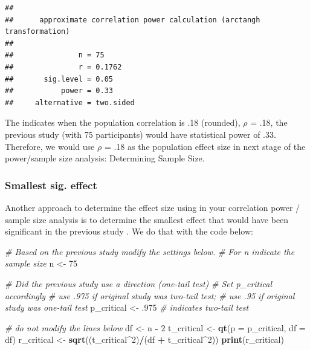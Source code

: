 \documentclass[
]{krantz}
\makeatletter
\newenvironment{Shaded}{\begin{snugshade}}{\end{snugshade}}
\newcommand{\CommentTok}[1]{\textcolor[rgb]{0.37,0.37,0.37}{\textit{#1}}}
\newcommand{\DataTypeTok}[1]{\textcolor[rgb]{0.27,0.27,0.27}{#1}}
\newcommand{\DecValTok}[1]{\textcolor[rgb]{0.06,0.06,0.06}{#1}}
\newcommand{\FloatTok}[1]{\textcolor[rgb]{0.06,0.06,0.06}{#1}}
\newcommand{\KeywordTok}[1]{\textcolor[rgb]{0.27,0.27,0.27}{\textbf{#1}}}
\newcommand{\NormalTok}[1]{#1}
\newcommand{\OperatorTok}[1]{\textcolor[rgb]{0.43,0.43,0.43}{\textbf{#1}}}
\newcommand{\StringTok}[1]{\textcolor[rgb]{0.5,0.5,0.5}{#1}}
\newenvironment{kframe}{%
\medskip{}
\setlength{\fboxsep}{.8em}
 \def\at@end@of@kframe{}%
 \ifinner\ifhmode%
  \def\at@end@of@kframe{\end{minipage}}%
  \begin{minipage}{\columnwidth}%
 \fi\fi%
 \def\FrameCommand##1{\hskip\@totalleftmargin \hskip-\fboxsep
 \colorbox{shadecolor}{##1}\hskip-\fboxsep
     \hskip-\linewidth \hskip-\@totalleftmargin \hskip\columnwidth}%
 \MakeFramed {\advance\hsize-\width
   \@totalleftmargin\z@ \linewidth\hsize
   \@setminipage}}%
 {\par\unskip\endMakeFramed%
 \at@end@of@kframe}
\renewenvironment{Shaded}{\begin{kframe}}{\end{kframe}}
\makeatother
\begin{document}
\begin{verbatim}
## 
##      approximate correlation power calculation (arctangh transformation) 
## 
##               n = 75
##               r = 0.1762
##       sig.level = 0.05
##           power = 0.33
##     alternative = two.sided
\end{verbatim}

The indicates when the population correlation is .18 (rounded), \(\rho\) = .18, the previous study (with 75 participants) would have statistical power of .33. Therefore, we would use \(\rho\) = .18 as the population effect size in next stage of the power/sample size analysis: Determining Sample Size.

\hypertarget{smallest-sig.-effect-2}{%
\subsubsection{Smallest sig. effect}\label{smallest-sig.-effect-2}}

Another approach to determine the effect size using in your correlation power / sample size analysis is to determine the smallest effect that would have been significant in the previous study \citep{lakens2018equivalence}. We do that with the code below:

\begin{Shaded}
\begin{Highlighting}[]
\CommentTok{# Based on the previous study modify the settings below.}
\CommentTok{# For n indicate the sample size}
\NormalTok{n <-}\StringTok{ }\DecValTok{75}

\CommentTok{# Did the previous study use a direction (one-tail test)}
\CommentTok{# Set p_critical accordingly}
\CommentTok{# use .975 if original study was two-tail test;}
\CommentTok{# use .95 if original study was one-tail test}
\NormalTok{p_critical <-}\StringTok{ }\FloatTok{.975} \CommentTok{# indicates two-tail test}

\CommentTok{# do not modify the lines below}
\NormalTok{df <-}\StringTok{ }\NormalTok{n }\OperatorTok{-}\StringTok{ }\DecValTok{2}
\NormalTok{t_critical <-}\StringTok{ }\KeywordTok{qt}\NormalTok{(}\DataTypeTok{p =}\NormalTok{ p_critical, }\DataTypeTok{df =}\NormalTok{ df) }
\NormalTok{r_critical <-}\StringTok{ }\KeywordTok{sqrt}\NormalTok{((t_critical}\OperatorTok{^}\DecValTok{2}\NormalTok{)}\OperatorTok{/}\NormalTok{(df }\OperatorTok{+}\StringTok{ }\NormalTok{t_critical}\OperatorTok{^}\DecValTok{2}\NormalTok{))}
\KeywordTok{print}\NormalTok{(r_critical)}
\end{Highlighting}
\end{Shaded}
\end{document}
